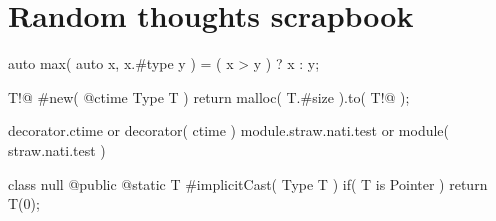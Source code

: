 \section{Random thoughts scrapbook}
\begin{code}
auto max( auto x, x.#type y ) = ( x > y ) ? x : y;

T!@ #new( @ctime Type T ) {
	return malloc( T.#size ).to( T!@ );
}

decorator.ctime or decorator( ctime )
module.straw.nati.test or module( straw.nati.test )

class null {
	@public @static	T #implicitCast( Type T )
		if( T is Pointer )
	{
		return T(0);
	}
}
\end{code}

          
